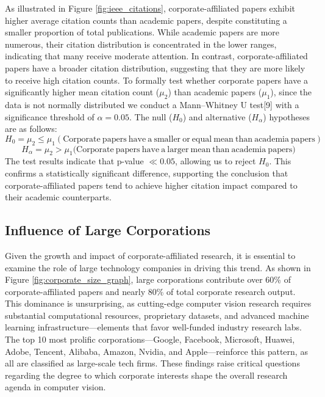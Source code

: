 \documentclass{article}
\begin{document}
As illustrated in Figure \ref{fig:ieee_citations}, corporate-affiliated papers exhibit higher average citation counts than academic papers, despite constituting a smaller proportion of total publications. While academic papers are more numerous, their citation distribution is concentrated in the lower ranges, indicating that many receive moderate attention. In contrast, corporate-affiliated papers have a broader citation distribution, suggesting that they are more likely to receive high citation counts. To formally test whether corporate papers have a significantly higher mean citation count ($\mu_2$) than academic papers ($\mu_1$), since the data is not normally distributed we conduct a Mann–Whitney U test[9] with a significance threshold of $\alpha = 0.05$. The null ($H_0$) and alternative ($H_\alpha$) hypotheses are as follows:
\[
H_0 = \mu_2 \leq \mu_1 (\mathrm{Corporate \ papers\ have \ a \ smaller \ or \ equal \ mean \ than \ academia \ papers})
\]
\[
H_\alpha = \mu_2 > \mu_1 (\mathrm{Corporate \ papers\ have \ a \ larger \ mean\ than \ academia \ papers)}
\]
The test results indicate that p-value $\ll 0.05$, allowing us to reject $H_0$. This confirms a statistically significant difference, supporting the conclusion that corporate-affiliated papers tend to achieve higher citation impact compared to their academic counterparts.   
\vspace{-10pt}
\subsection{Influence of Large Corporations}
\vspace{-7pt}
Given the growth and impact of corporate-affiliated research, it is essential to examine the role of large technology companies in driving this trend. As shown in Figure \ref{fig:corporate_size_graph}, large corporations contribute over 60\% of corporate-affiliated papers and nearly 80\% of total corporate research output. This dominance is unsurprising, as cutting-edge computer vision research requires substantial computational resources, proprietary datasets, and advanced machine learning infrastructure—elements that favor well-funded industry research labs. The top 10 most prolific corporations—Google, Facebook, Microsoft, Huawei, Adobe, Tencent, Alibaba, Amazon, Nvidia, and Apple—reinforce this pattern, as all are classified as large-scale tech firms. These findings raise critical questions regarding the degree to which corporate interests shape the overall research agenda in computer vision.
\end{document}
